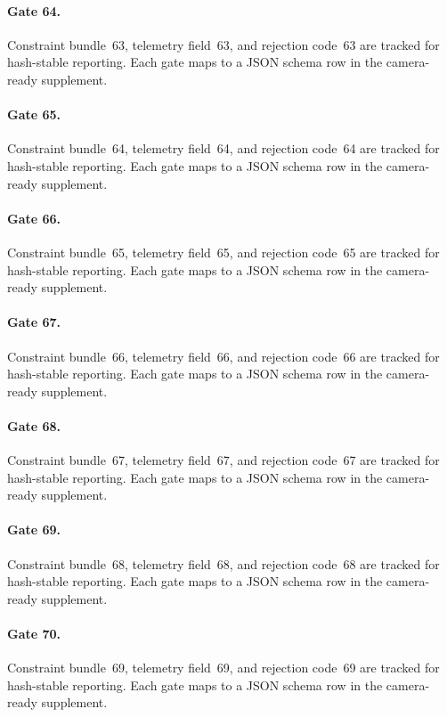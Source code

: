 \documentclass[sigconf,nonacm]{acmart}
\begin{document}
\paragraph{Gate 64.}
Constraint bundle~63, telemetry field~63, and rejection code~63 are tracked for hash-stable reporting. Each gate maps to a JSON schema row in the camera-ready supplement. %

\paragraph{Gate 65.}
Constraint bundle~64, telemetry field~64, and rejection code~64 are tracked for hash-stable reporting. Each gate maps to a JSON schema row in the camera-ready supplement. %

\paragraph{Gate 66.}
Constraint bundle~65, telemetry field~65, and rejection code~65 are tracked for hash-stable reporting. Each gate maps to a JSON schema row in the camera-ready supplement. %

\paragraph{Gate 67.}
Constraint bundle~66, telemetry field~66, and rejection code~66 are tracked for hash-stable reporting. Each gate maps to a JSON schema row in the camera-ready supplement. %

\paragraph{Gate 68.}
Constraint bundle~67, telemetry field~67, and rejection code~67 are tracked for hash-stable reporting. Each gate maps to a JSON schema row in the camera-ready supplement. %

\paragraph{Gate 69.}
Constraint bundle~68, telemetry field~68, and rejection code~68 are tracked for hash-stable reporting. Each gate maps to a JSON schema row in the camera-ready supplement. %

\paragraph{Gate 70.}
Constraint bundle~69, telemetry field~69, and rejection code~69 are tracked for hash-stable reporting. Each gate maps to a JSON schema row in the camera-ready supplement. %
\end{document}
